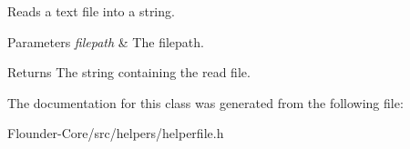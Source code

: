 Reads a text file into a string. 


\begin{DoxyParams}{Parameters}
{\em filepath} & The filepath. \\
\hline
\end{DoxyParams}
\begin{DoxyReturn}{Returns}
The string containing the read file. 
\end{DoxyReturn}


The documentation for this class was generated from the following file\+:\begin{DoxyCompactItemize}
\item 
Flounder-\/\+Core/src/helpers/helperfile.\+h\end{DoxyCompactItemize}
